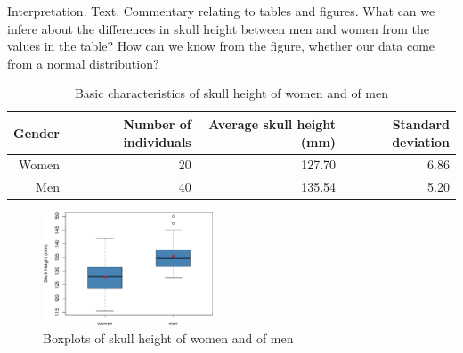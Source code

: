  Interpretation. Text. Commentary relating to tables and figures. What can we infere about the differences in skull height between men and women from the values in the table? How can we know from the figure, whether our data come from a normal distribution?

\begin{table}[ht]
\footnotesize
\centering

\begin{tabular}{r||rrr}
 Gender & Number of individuals & Average skull height (mm) & Standard deviation \\ 
 \hline \hline
Women & 20 & 127.70 & 6.86 \\ 
Men & 40 & 135.54 & 5.20 \\ 
\end{tabular}
\caption{Basic characteristics of skull height of women and of men}
\end{table}


\begin{figure}[ht]
\centering
\includegraphics[angle=0,width=0.45\textwidth]{boxplot-example.pdf}
\caption{Boxplots of skull height of women and of men}
\end{figure}